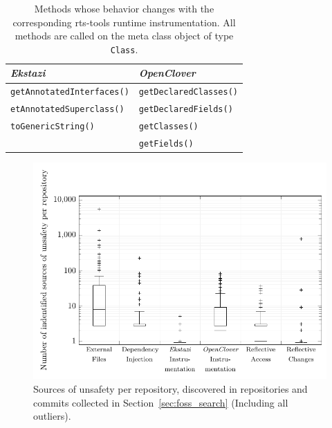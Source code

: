 \vspace{1cm}

\begin{table}[H]
    \caption{Methods whose behavior changes with the corresponding \ac{rts}-tools runtime
        instrumentation. All methods are called on the meta class object of type \nolinkurl{Class}.}\label{table:runtime_instr_methods}
    \centering
    \begin{tabular}{l | l}
        \hline
        \emph{Ekstazi}                    & \emph{OpenClover}             \\
        \hline
        \texttt{getAnnotatedInterfaces()} & \texttt{getDeclaredClasses()} \\
        \texttt{etAnnotatedSuperclass()}  & \texttt{getDeclaredFields()}  \\
        \texttt{toGenericString()}        & \texttt{getClasses()}         \\
                                          & \texttt{getFields()}          \\
    \end{tabular}
\end{table}

\vspace{1cm}

\begin{figure}[H]
    \caption{Sources of unsafety per repository, discovered in repositories and commits collected in
        Section~\ref{sec:foss_search} (Including all outliers).}\label{appx:fig:box_plot}
    \centering
    \vspace{2em}
    \includegraphics{./figures/pdf/box_plot_outliers.pdf}
\end{figure}

